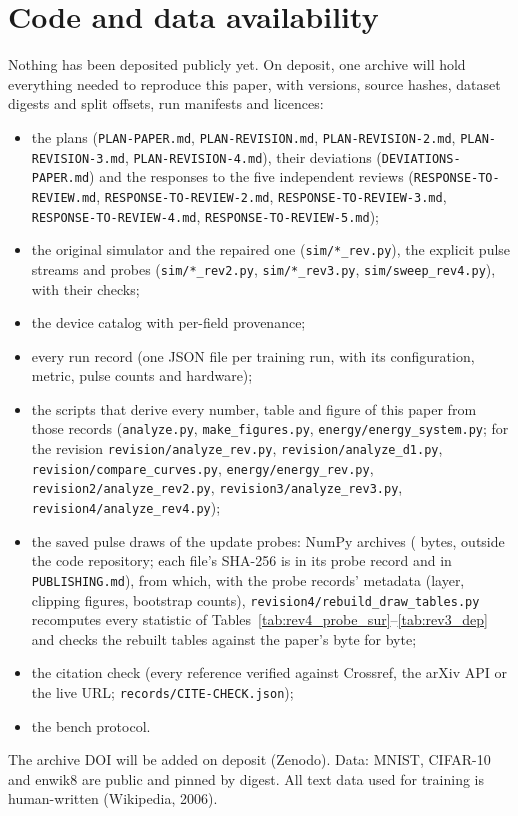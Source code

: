 








\section{Code and data availability}\label{sec:availability}
\begin{sloppypar}
Nothing has been deposited publicly yet. On deposit, one archive will hold everything needed to reproduce this paper, with
versions, source hashes, dataset digests and split offsets, run manifests and licences:
\begin{itemize}
\item the plans (\texttt{PLAN-PAPER.md}, \texttt{PLAN-REVISION.md}, \texttt{PLAN-REVISION-2.md},
      \texttt{PLAN-REVISION-3.md}, \texttt{PLAN-REVISION-4.md}), their deviations (\texttt{DEVIATIONS-PAPER.md}) and the responses to the five
      independent reviews (\texttt{RESPONSE-TO-REVIEW.md}, \texttt{RESPONSE-TO-REVIEW-2.md},
      \texttt{RESPONSE-TO-REVIEW-3.md}, \texttt{RESPONSE-TO-REVIEW-4.md}, \texttt{RESPONSE-TO-REVIEW-5.md});
\item the original simulator and the repaired one (\texttt{sim/*\_rev.py}), the explicit pulse streams and probes
      (\texttt{sim/*\_rev2.py}, \texttt{sim/*\_rev3.py}, \texttt{sim/sweep\_rev4.py}), with their checks;
\item the device catalog with per-field provenance;
\item every run record (one JSON file per training run, with its configuration, metric, pulse counts and hardware);
\item the scripts that derive every number, table and figure of this paper from those records (\texttt{analyze.py},
      \texttt{make\_figures.py}, \texttt{energy/energy\_system.py}; for the revision \texttt{revision/analyze\_rev.py},
      \texttt{revision/analyze\_d1.py}, \texttt{revision/compare\_curves.py}, \texttt{energy/energy\_rev.py},
      \texttt{revision2/analyze\_rev2.py}, \texttt{revision3/analyze\_rev3.py}, \texttt{revision4/analyze\_rev4.py});
\item the saved pulse draws of the update probes: \RZDrawN{} NumPy archives (\RZDrawBytes{} bytes, outside the code
      repository; each file's SHA-256 is in its probe record and in \texttt{PUBLISHING.md}), from which, with the probe records' metadata (layer, clipping figures,
      bootstrap counts), \texttt{revision4/rebuild\_draw\_tables.py} recomputes every statistic of
      Tables~\ref{tab:rev4_probe_sur}--\ref{tab:rev3_dep} and checks the rebuilt tables against the paper's byte for byte;
\item the citation check (every reference verified against Crossref, the arXiv API or the live URL;
      \texttt{records/CITE-CHECK.json});
\item the bench protocol.
\end{itemize}
The archive DOI will be added on deposit (Zenodo). Data: MNIST, CIFAR-10 and enwik8 are public and pinned by digest. All text
data used for training is human-written (Wikipedia, 2006).


\end{sloppypar}

